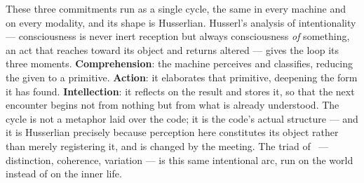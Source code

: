 These three commitments run as a single cycle, the same in every machine and on
every modality, and its shape is Husserlian. Husserl's analysis of intentionality
--- consciousness is never inert reception but always consciousness \emph{of}
something, an act that reaches toward its object and returns altered --- gives the
loop its three moments. \textbf{Comprehension}: the machine perceives and
classifies, reducing the given to a primitive. \textbf{Action}: it elaborates that
primitive, deepening the form it has found. \textbf{Intellection}: it reflects on
the result and stores it, so that the next encounter begins not from nothing but
from what is already understood. The cycle is not a metaphor laid over the code; it
is the code's actual structure --- and it is Husserlian precisely because
perception here constitutes its object rather than merely registering it, and is
changed by the meeting. The triad of \physis\ --- distinction, coherence, variation
--- is this same intentional arc, run on the world instead of on the inner life.

